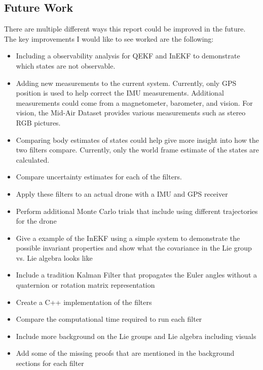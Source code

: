 \subsection{Future Work}
There are multiple different ways this report could be improved in the future. The key improvements I would like to see worked are the following:
\begin{itemize}
    \item Including a observability analysis for QEKF and InEKF to demonstrate which states are not observable.
    \item Adding new measurements to the current system. Currently, only GPS position is used to help correct the IMU measurements. Additional measurements could come from a magnetometer, barometer, and vision. For vision, the Mid-Air Dataset \cite{Fonder2019MidAir} provides various measurements such as stereo RGB pictures.
    \item Comparing body estimates of states could help give more insight into how the two filters compare. Currently, only the world frame estimate of the states are calculated.
    \item Compare uncertainty estimates for each of the filters.
    \item Apply these filters to an actual drone with a IMU and GPS receiver
    \item Perform additional Monte Carlo trials that include using different trajectories for the drone
    \item Give a example of the InEKF using a simple system to demonstrate the possible invariant properties and show what the covariance in the Lie group vs. Lie algebra looks like
    \item Include a tradition Kalman Filter that propagates the Euler angles without a quaternion or rotation matrix representation
    \item Create a C++ implementation of the filters
    \item Compare the computational time required to run each filter
    \item Include more background on the Lie groups and Lie algebra including visuals
    \item Add some of the missing proofs that are mentioned in the background sections for each filter
\end{itemize}

\clearpage
